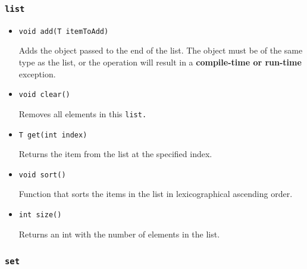 \documentclass{report}
\begin{document}

\subsubsection{\tt list \rm} %
\label{ssub:list}

\begin{itemize}

\item[] \tt void add(T itemToAdd) \rm

Adds the object passed to the end of the list. The object must be of the same
type as the list, or the operation will result in a \textbf{compile-time or
run-time} exception.

\item[] \tt void clear() \rm

Removes all elements in this \tt list\rm.

\item[] \tt T get(int index) \rm

Returns the item from the list at the specified index.


\item[] \tt void sort() \rm

Function that sorts the items in the list in lexicographical ascending order.

\item[] \tt int size() \rm

Returns an int with the number of elements in the list.

\end{itemize}



\subsubsection{\tt set \rm} %
\label{ssub:tt_set_rm}
\end{document}

